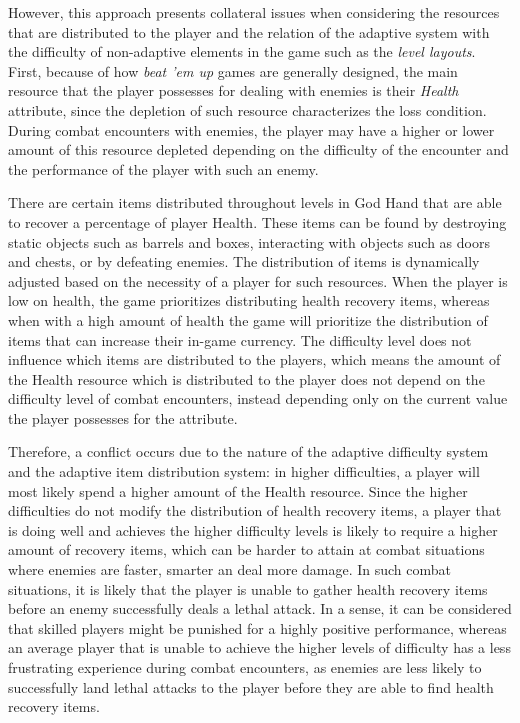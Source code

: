 
However, this approach presents collateral issues when considering the resources that are distributed to the player and the relation of the adaptive system with the difficulty of non-adaptive elements in the game such as the \emph{level layouts}. First, because of how \emph{beat 'em up} games are generally designed, the main resource that the player possesses for dealing with enemies is their \emph{Health} attribute, since the depletion of such resource characterizes the loss condition. During combat encounters with enemies, the player may have a higher or lower amount of this resource depleted depending on the difficulty of the encounter and the performance of the player with such an enemy. 

There are certain items distributed throughout levels in God Hand that are able to recover a percentage of player Health. These items can be found by destroying static objects such as barrels and boxes, interacting with objects such as doors and chests, or by defeating enemies. The distribution of items is dynamically adjusted based on the necessity of a player for such resources. When the player is low on health, the game prioritizes distributing health recovery items, whereas when with a high amount of health the game will prioritize the distribution of items that can increase their in-game currency. The difficulty level does not influence which items are distributed to the players, which means the amount of the Health resource which is distributed to the player does not depend on the difficulty level of combat encounters, instead depending only on the current value the player possesses for the attribute. 

Therefore, a conflict occurs due to the nature of the adaptive difficulty system and the adaptive item distribution system: in higher difficulties, a player will most likely spend a higher amount of the Health resource. Since the higher difficulties do not modify the distribution of health recovery items, a player that is doing well and achieves the higher difficulty levels is likely to require a higher amount of recovery items, which can be harder to attain at combat situations where enemies are faster, smarter an deal more damage. In such combat situations, it is likely that the player is unable to gather health recovery items before an enemy successfully deals a lethal attack. In a sense, it can be considered that skilled players might be punished for a highly positive performance, whereas an average player that is unable to achieve the higher levels of difficulty has a less frustrating experience during combat encounters, as enemies are less likely to successfully land lethal attacks to the player before they are able to find health recovery items.

